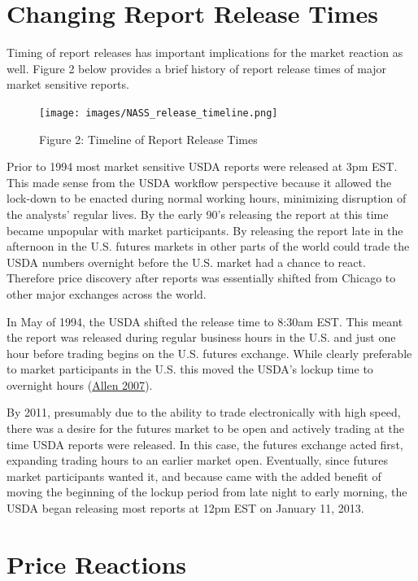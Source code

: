 \documentclass[
]{book}
\begin{document}
\hypertarget{changing-report-release-times}{%
\section{Changing Report Release Times}\label{changing-report-release-times}}

Timing of report releases has important implications for the market reaction as well. Figure 2 below provides a brief history of report release times of major market sensitive reports.

\begin{figure}
\centering
\texttt{[image: images/NASS\_release\_timeline.png]}
\caption{Figure 2: Timeline of Report Release Times}
\end{figure}

Prior to 1994 most market sensitive USDA reports were released at 3pm EST. This made sense from the USDA workflow perspective because it allowed the lock-down to be enacted during normal working hours, minimizing disruption of the analysts' regular lives. By the early 90's releasing the report at this time became unpopular with market participants. By releasing the report late in the afternoon in the U.S. futures markets in other parts of the world could trade the USDA numbers overnight before the U.S. market had a chance to react. Therefore price discovery after reports was essentially shifted from Chicago to other major exchanges across the world.

In May of 1994, the USDA shifted the release time to 8:30am EST. This meant the report was released during regular business hours in the U.S. and just one hour before trading begins on the U.S. futures exchange. While clearly preferable to market participants in the U.S. this moved the USDA's lockup time to overnight hours (\protect\hyperlink{ref-history2007Nass}{Allen 2007}).

By 2011, presumably due to the ability to trade electronically with high speed, there was a desire for the futures market to be open and actively trading at the time USDA reports were released. In this case, the futures exchange acted first, expanding trading hours to an earlier market open. Eventually, since futures market participants wanted it, and because came with the added benefit of moving the beginning of the lockup period from late night to early morning, the USDA began releasing most reports at 12pm EST on January 11, 2013.

\hypertarget{price-reactions}{%
\section{Price Reactions}\label{price-reactions}}
\end{document}
